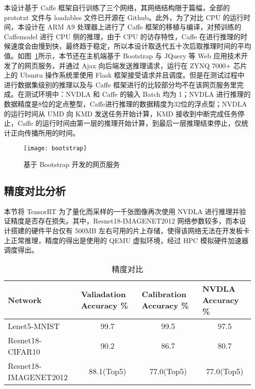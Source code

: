 本设计基于 Caffe 框架自行训练了三个网络，其网络结构限于篇幅，全部的 prototxt 文件与 loadables 文件已开源在 Github\cite{nvdla_loadables}。此外，为了对比 CPU 的运行时间，本设计在 ARM A9 处理器上进行了 Caffe 框架的移植与编译，对预训练的 Caffemodel 进行 CPU 侧的推理，由于 CPU 的访存特性，Caffe 在进行推理的时候速度会由慢到快，最终趋于稳定，所以本设计取迭代五十次后取推理时间的平均值。如图~\ref{fig:BootStrap}所示，本节还在主机端基于 Bootstrap 与 JQuery 等 Web 应用技术开发了的网页服务，并通过 Ajax 向后端发送推理请求，运行在 ZYNQ 7000+ 芯片上的 Ubuntu 操作系统里使用 Flask 框架接受请求并且调度。但是在测试过程中进行数据集级别的推理以及与 Caffe 框架进行的比较部分均不在该网页服务里完成。在测试环境中：NVDLA 和 Caffe 的输入 Batch 均为 1；NVDLA 进行推理的数据精度是8位的定点整型，Caffe进行推理的数据精度为32位的浮点型；NVDLA 的运行时间从 UMD 向 KMD 发送任务开始计算，KMD 接收到中断完成任务停止，Caffe 的运行时间由第一层的推理开始计算，到最后一层推理结束停止，仅统计正向传播所用的时间。

\begin{figure}[!htbp]
    \centering
    \texttt{[image: bootstrap]}
    \caption{基于 Bootstrap 开发的网页服务}
    \label{fig:BootStrap}
\end{figure}

\subsection{精度对比分析}

本节将 TensorRT 为了量化而采样的一千张图像再次使用 NVDLA 进行推理并验证精度是否存在损失。其中，Resnet18-IMAGENET2012 网络参数较多，而本设计搭建的硬件平台仅有 500MB 左右可用的片上存储，使得该网络无法在开发板卡上正常推理，精度的得出是使用的 QEMU 虚拟环境，经过 HPC 模拟硬件加速器调度得出。

\begin{table}[!htbp]
    \caption{精度对比}
    \label{tab:Qualifications Report}
    \centering
    \footnotesize%
    \setlength{\tabcolsep}{4pt}%
    \renewcommand{\arraystretch}{1.2}%
    \begin{tabular}{lccc}
        \toprule
        \textbf{Network}      & \multicolumn{1}{l}{\textbf{Valiadation Accuracy \%}} & \multicolumn{1}{l}{\textbf{Calibration Accuracy \%}}  & \multicolumn{1}{l}{\textbf{NVDLA Accuracy \%}} \\
        \midrule
        Lenet5-MNIST          & 99.7                                                 & 99.5                                                 & 97.5                                                 \\  
        Resnet18-CIFAR10      & 90.2                                                 & 86.7                                                 & 80.7                                                 \\
        Resnet18-IMAGENET2012 & 88.1(Top5)                                           & 77.0(Top5)                                           & 77.0(Top5)                                           \\
        \bottomrule                   
    \end{tabular}
\end{table}

